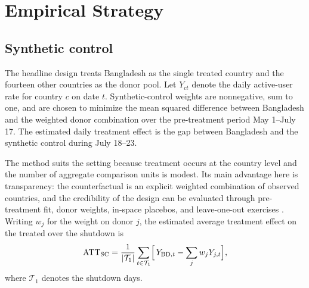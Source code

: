 \section{Empirical Strategy}
\label{sec:strategy}

\subsection{Synthetic control}
\label{sec:sc}

The headline design treats Bangladesh as the single treated country and the fourteen other countries as the donor pool. Let $Y_{ct}$ denote the daily active-user rate for country $c$ on date $t$. Synthetic-control weights are nonnegative, sum to one, and are chosen to minimize the mean squared difference between Bangladesh and the weighted donor combination over the pre-treatment period May 1--July 17. The estimated daily treatment effect is the gap between Bangladesh and the synthetic control during July 18--23.

The method suits the setting because treatment occurs at the country level and the number of aggregate comparison units is modest. Its main advantage here is transparency: the counterfactual is an explicit weighted combination of observed countries, and the credibility of the design can be evaluated through pre-treatment fit, donor weights, in-space placebos, and leave-one-out exercises \citep*{abadie2010,abadie2021}. Writing $w_j$ for the weight on donor $j$, the estimated average treatment effect on the treated over the shutdown is
\begin{equation}
  \mathrm{ATT}_{\mathrm{SC}} = \frac{1}{|\mathcal{T}_{1}|}\sum_{t \in \mathcal{T}_{1}}
  \Bigl[\, Y_{\mathrm{BD},t} - \sum_{j} w_{j} Y_{j,t} \Bigr],
  \label{eq:att_sc}
\end{equation}
where $\mathcal{T}_{1}$ denotes the shutdown days.

